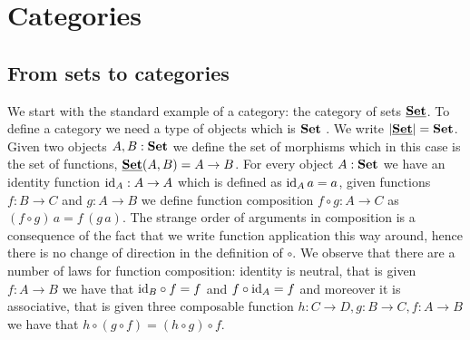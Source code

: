 \section{Categories}
\label{sec:categories}

\subsection{From sets to categories}
\label{sec:from-sets-categories}

We start with the standard example of a category: the category of sets $\underline{\mathbf{\mathbf{Set}}}$. To define a category we need a type of objects which is $\mathbf{Set}$
. We write $|\underline{\mathbf{\mathbf{Set}}}| = \mathbf{Set}$. 
Given two objects $A,B : \mathbf{Set}$ we define the set of morphisms which in this case is the set of functions, $\underline{\mathbf{\mathbf{Set}}}(A,B) = A \to B$. For every object $A : \mathbf{Set}$ we have an identity function $\mathrm{id}_A : A \to A$ which is defined as $\mathrm{id}_A\,a = a$, given functions $f : B \to C$ and $g : A \to B$ we define function composition $f \circ g : A \to C$ as $(f\circ g)\,a = f\,(g\,a)$. The strange order of arguments in composition is a consequence of the fact that we write function application this way around, hence there is no change of direction in the definition of $\circ$. We observe that there are a number of laws for function composition: identity is neutral, that is given $f : A \to B$ we have that $\mathrm{id}_B \circ f = f$ and $f \circ \mathrm{id}_A = f$ and moreover it is associative, that is given three composable function $h : C \to D, g : B \to C, f : A \to B$ we have that $h \circ (g \circ f) = (h \circ g) \circ f$.


